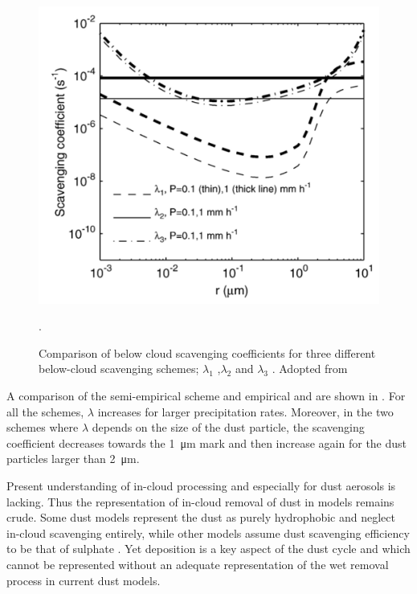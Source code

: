 \begin{figure}[htpb]
    \centering
    \includegraphics[draft=False,scale=.5]{texfiles/figs/Scavenging.PNG}
    \caption{Comparison of below cloud scavenging coefficients for three different below-cloud scavenging schemes; $\lambda_1$ \textcite{jung2006intercomparison},$\lambda_2$ \textcite{brandt2002modelling} and $\lambda_3$ \textcite{laakso2003ultrafine}. Adopted from \textcite{jung2006intercomparison}}.
    \label{fig:scavenging}
\end{figure}
A comparison of the semi-empirical \textcite{ShaoYaping2008PaMo} scheme and empirical \textcite{brandt2002modelling} and \textcite{laakso2003ultrafine} are shown in . For all the schemes, $\lambda$ increases for larger precipitation rates. Moreover, in the two schemes where $\lambda$ depends on the size of the dust particle, the scavenging coefficient decreases towards the \SI{1}{\micro\metre} mark and then increase again for the dust particles larger than \SI{2}{\micro\metre}.

Present understanding of in-cloud processing and especially for dust aerosols is lacking. Thus the representation of in-cloud removal of dust in models remains crude. Some dust models represent the dust as purely hydrophobic and neglect in-cloud scavenging entirely, while other models assume dust scavenging efficiency to be that of sulphate \parencite{bergametti2014dust}. Yet deposition is a key aspect of the dust cycle and which cannot be represented without an adequate representation of the wet removal process in current dust models. 
